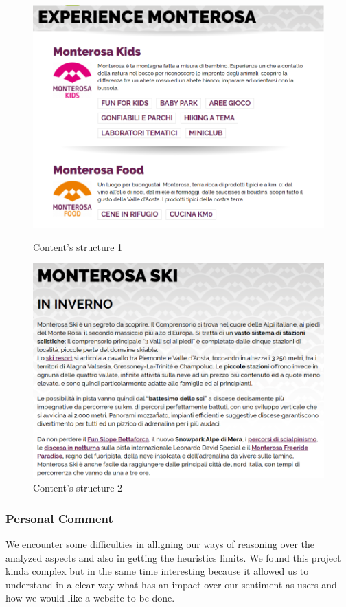 \begin{figure}[h!]
	\centering
	\begin{minipage}[b]{0.4\textwidth}
    		\includegraphics[width=\textwidth]{./assets/structure1.png}
		\caption{Content's structure 1}
	\end{minipage}
	\hfill
	\centering
	\begin{minipage}[b]{0.4\textwidth}
    		\includegraphics[width=\textwidth]{./assets/structure2.png}
		\caption{Content's structure 2}
	\end{minipage}
\end{figure}
\FloatBarrier

\subsubsection*{Personal Comment}
We encounter some difficulties in alligning our ways of reasoning over the analyzed aspects and also in getting the heuristics limits. We found this project kinda complex but in the same time interesting because it allowed us to understand in a clear way what has an impact over our sentiment as users and how we would like a website to be done.
